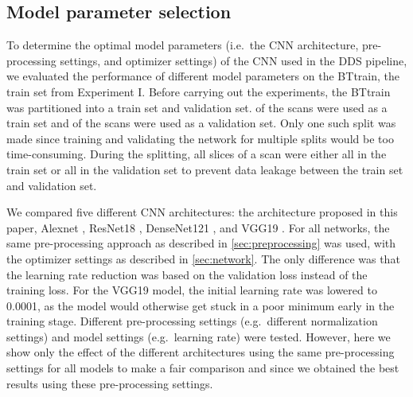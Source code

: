 \clearpage
\begin{subappendices}
\section{Model parameter selection}\label{app:crossval}

To determine the optimal model parameters (i.e.\ the \gls{CNN} architecture, pre-processing settings, and optimizer settings) of the \gls{CNN} used in the \gls{DDS} pipeline, we evaluated the performance of different model parameters on the \gls{BTtrain}, the train set from Experiment I.
Before carrying out the experiments, the \gls{BTtrain} was partitioned into a train set and validation set.
 of the \glspl{scan} were used as a train set and  of the \glspl{scan} were used as a validation set.
Only one such split was made since training and validating the network for multiple splits would be too time-consuming.
During the splitting, all \glspl{slice} of a \gls{scan} were either all in the train set or all in the validation set to prevent data leakage between the train set and validation set.

We compared five different \gls{CNN} architectures: the architecture proposed in this paper, Alexnet \autocite{krizhevsky2012imagenet}, ResNet18 \autocite{he2016deep}, DenseNet121 \autocite{huang2017densely}, and VGG19 \autocite{simonyan2014very}.
For all networks, the same pre-processing approach as described in \cref{sec:preprocessing} was used, with the optimizer settings as described in \cref{sec:network}.
The only difference was that the learning rate reduction was based on the validation loss instead of the training loss.
For the VGG19 model, the initial learning rate was lowered to \num{0.0001}, as the model would otherwise get stuck in a poor minimum early in the training stage.
Different pre-processing settings (e.g.\ different normalization settings) and model settings (e.g.\ learning rate) were tested.
However, here we show only the effect of the different architectures using the same pre-processing settings for all models to make a fair comparison and since we obtained the best results using these pre-processing settings.


\end{subappendices}
